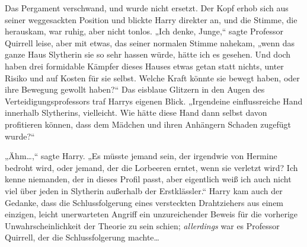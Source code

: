 Das Pergament verschwand, und wurde nicht ersetzt. Der Kopf erhob sich aus seiner weggesackten Position und blickte Harry direkter an, und die Stimme, die herauskam, war ruhig, aber nicht tonlos. „Ich denke, Junge,“ sagte Professor Quirrell leise, aber mit etwas, das seiner normalen Stimme nahekam, „wenn das ganze Haus Slytherin sie so sehr hassen würde, hätte ich es gesehen. Und doch haben drei formidable Kämpfer dieses Hauses etwas getan statt nichts, unter Risiko und auf Kosten für sie selbst. Welche Kraft könnte sie bewegt haben, oder ihre Bewegung gewollt haben?“ Das eisblaue Glitzern in den Augen des Verteidigungsprofessors traf Harrys eigenen Blick. „Irgendeine einflussreiche Hand innerhalb Slytherins, vielleicht. Wie hätte diese Hand dann selbst davon profitieren können, dass dem Mädchen und ihren Anhängern Schaden zugefügt wurde?“

„Ähm…,“ sagte Harry. „Es müsste jemand sein, der irgendwie von Hermine bedroht wird, oder jemand, der die Lorbeeren erntet, wenn sie verletzt wird? Ich kenne niemanden, der in dieses Profil passt, aber eigentlich weiß ich auch nicht viel über jeden in Slytherin außerhalb der Erstklässler.“ Harry kam auch der Gedanke, dass die Schlussfolgerung eines versteckten Drahtziehers aus einem einzigen, leicht unerwarteten Angriff ein unzureichender Beweis für die vorherige Unwahrscheinlichkeit der Theorie zu sein schien; \emph{allerdings} war es Professor Quirrell, der die Schlussfolgerung machte…

